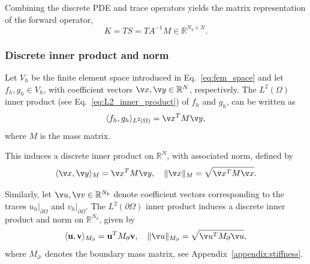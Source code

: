 Combining the discrete PDE and trace operators yields the matrix representation of the forward operator,
\begin{equation}\label{eq:discrete_K}
    K = T S = T A^{-1} M \in \mathbb{R}^{N_b \times N}.
\end{equation}
%


\subsubsection{Discrete inner product and norm}
Let $V_h$ be the finite element space introduced in Eq.~\eqref{eq:fem_space} and let $f_h, g_h \in V_h$, with coefficient vectors $\v x, \v y \in \mathbb{R}^N$, respectively. The $L^2(\Omega)$ inner product (see Eq.~\eqref{eq:L2_inner_product}) of $f_h$ and $g_h$, can be written as
\begin{equation}
    \langle f_h, g_h \rangle_{L^2(\Omega)} = \v x^T M \v y,
\end{equation}
where $M$ is the mass matrix. 

This induces a discrete inner product on $\mathbb{R}^N$, with associated norm, defined by
\begin{equation}\label{eq:fem_norm}
    \langle \v x, \v y \rangle_M = \v x^T M \v y,
    \quad
    \| \v x \|_M = \sqrt{\v x^T M \v x}.
\end{equation}

Similarly, let $\v u, \v v \in \mathbb{R}^{N_b}$ 
denote coefficient vectors corresponding to the traces 
$u_h|_{\partial\Omega}$ and $v_h|_{\partial\Omega}$. The $L^2(\partial\Omega)$ inner product induces a discrete inner product and norm on $\mathbb{R}^{N_b}$, given by
\begin{equation}\label{eq:fem_norm_ds}
    \langle \mathbf{u}, \mathbf{v} \rangle_{M_{\partial}}
    = \mathbf{u}^T M_{\partial} \mathbf{v},
    \quad
    \| \v  u \|_{M_{\partial}}
    =
    \sqrt{ \v  u^T M_{\partial} \v u},
\end{equation}
where $M_\partial$ denotes the boundary mass matrix, see Appendix~\ref{appendix:stiffness}.
%



